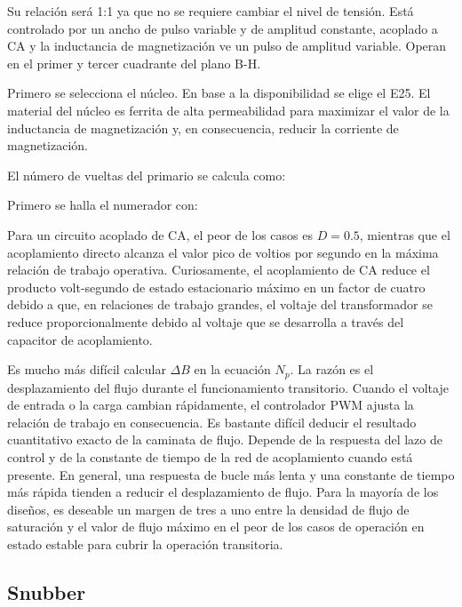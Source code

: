 Su relación será 1:1 ya que no se requiere cambiar el nivel de tensión.
Está controlado por un ancho de pulso variable y de amplitud constante,
acoplado a CA y la inductancia de magnetización ve un pulso de amplitud variable.
Operan en el primer y tercer cuadrante del plano B-H.

Primero se selecciona el núcleo. En base a la disponibilidad se elige el E25. 
El material del núcleo es ferrita de alta permeabilidad para maximizar el valor de 
la inductancia de magnetización y, en consecuencia, reducir la corriente de magnetización.

El número de vueltas del primario se calcula como: 



Primero se halla el numerador con:


Para un circuito acoplado de CA, el peor de los casos es $D=0.5$, 
mientras que el acoplamiento directo alcanza el valor pico de voltios por segundo en la máxima relación de trabajo operativa. 
Curiosamente, el acoplamiento de CA reduce el producto volt-segundo de estado estacionario máximo en un factor de cuatro debido a que, 
en relaciones de trabajo grandes, el voltaje del transformador se reduce proporcionalmente debido al voltaje que 
se desarrolla a través del capacitor de acoplamiento.

Es mucho más difícil calcular $\Delta B$ en la ecuación $N_p$. 
La razón es el desplazamiento del flujo durante el funcionamiento transitorio. 
Cuando el voltaje de entrada o la carga cambian rápidamente, el controlador PWM ajusta la relación de trabajo en consecuencia. 
Es bastante difícil deducir el resultado cuantitativo exacto de la caminata de flujo. 
Depende de la respuesta del lazo de control y de la constante de tiempo de la red de acoplamiento cuando está presente. 
En general, una respuesta de bucle más lenta y una constante de tiempo más rápida tienden a reducir el desplazamiento de flujo. 
Para la mayoría de los diseños, es deseable un margen de tres a uno entre la densidad de flujo de saturación 
y el valor de flujo máximo en el peor de los casos de operación en estado estable para cubrir la operación transitoria.

\subsection{Snubber}

